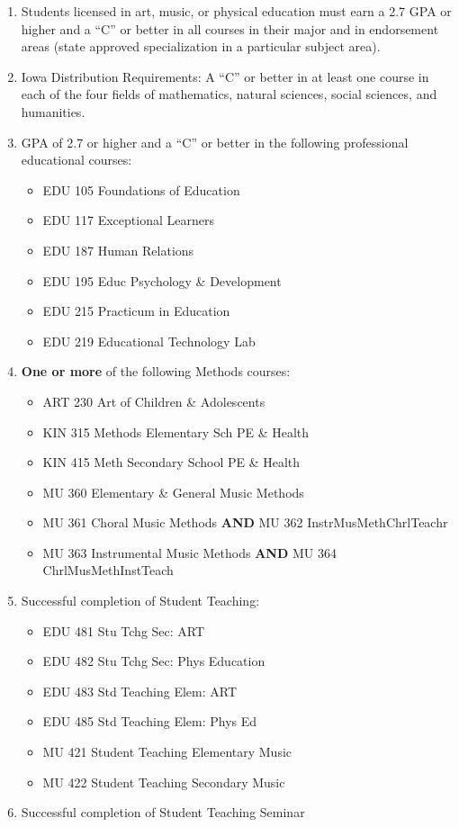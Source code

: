 \documentclass[
  letterpaper,
]{scrbook}
\providecommand{\tightlist}{%
  \setlength{\itemsep}{0pt}\setlength{\parskip}{0pt}}
\begin{document}
\begin{enumerate}
\def\labelenumi{\arabic{enumi}.}
\tightlist
\item
  Students licensed in art, music, or physical education must earn a 2.7
  GPA or higher and a ``C'' or better in all courses in their major and
  in endorsement areas (state approved specialization in a particular
  subject area).
\item
  Iowa Distribution Requirements: A ``C'' or better in at least one
  course in each of the four fields of mathematics, natural sciences,
  social sciences, and humanities.
\item
  GPA of 2.7 or higher and a ``C'' or better in the following
  professional educational courses:

  \begin{itemize}
  \tightlist
  \item
    EDU 105 Foundations of Education
  \item
    EDU 117 Exceptional Learners
  \item
    EDU 187 Human Relations
  \item
    EDU 195 Educ Psychology \& Development
  \item
    EDU 215 Practicum in Education
  \item
    EDU 219 Educational Technology Lab
  \end{itemize}
\item
  \textbf{One or more} of the following Methods courses:

  \begin{itemize}
  \tightlist
  \item
    ART 230 Art of Children \& Adolescents
  \item
    KIN 315 Methods Elementary Sch PE \& Health
  \item
    KIN 415 Meth Secondary School PE \& Health
  \item
    MU 360 Elementary \& General Music Methods
  \item
    MU 361 Choral Music Methods \textbf{AND} MU 362
    InstrMusMethChrlTeachr
  \item
    MU 363 Instrumental Music Methods \textbf{AND} MU 364
    ChrlMusMethInstTeach
  \end{itemize}
\item
  Successful completion of Student Teaching:

  \begin{itemize}
  \tightlist
  \item
    EDU 481 Stu Tchg Sec: ART
  \item
    EDU 482 Stu Tchg Sec: Phys Education
  \item
    EDU 483 Std Teaching Elem: ART
  \item
    EDU 485 Std Teaching Elem: Phys Ed
  \item
    MU 421 Student Teaching Elementary Music
  \item
    MU 422 Student Teaching Secondary Music
  \end{itemize}
\item
  Successful completion of Student Teaching Seminar


\end{enumerate}
\end{document}
